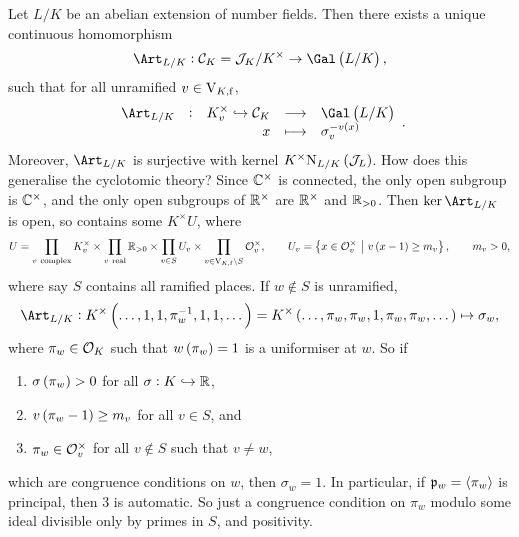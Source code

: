 Let $ L / K $ be an abelian extension of number fields. Then there exists a unique continuous homomorphism
$$ \Art_{L / K} : \CCC_K = \JJJ_K / K^\times \to \Gal\br{L / K}, $$
such that for all unramified $ v \in \mathrm{V}_{K, \mathrm{f}} $,
$$ \function[\Art_{L / K}]{K_v^\times \hookrightarrow \CCC_K}{\Gal\br{L / K}}{x}{\sigma_v^{-v\br{x}}}. $$
Moreover, $ \Art_{L / K} $ is surjective with kernel $ K^\times \N_{L / K}\br{\JJJ_L} $. How does this generalise the cyclotomic theory? Since $ \mathbb{C}^\times $ is connected, the only open subgroup is $ \mathbb{C}^\times $, and the only open subgroups of $ \mathbb{R}^\times $ are $ \mathbb{R}^\times $ and $ \mathbb{R}_{> 0} $. Then $ \ker \Art_{L / K} $ is open, so contains some $ K^\times U $, where
$$ U = \prod_{v \ \text{complex}} K_v^\times \times \prod_{v \ \text{real}} \RR_{> 0} \times \prod_{v \in S} U_v \times \prod_{v \in \V_{K, \f} \setminus S} \OOO_v^\times, \qquad U_v = \cbr{x \in \OOO_v^\times \st v\br{x - 1} \ge m_v}, \qquad m_v > 0, $$
where say $ S $ contains all ramified places. If $ w \notin S $ is unramified,
$$ \Art_{L / K} : K^\times\br{\dots, 1, 1, \pi_w^{-1}, 1, 1, \dots} = K^\times\br{\dots, \pi_w, \pi_w, 1, \pi_w, \pi_w, \dots} \mapsto \sigma_w, $$
where $ \pi_w \in \mathcal{O}_K $ such that $ w\br{\pi_w} = 1 $ is a uniformiser at $ w $. So if
\begin{enumerate}
\item $ \sigma\br{\pi_w} > 0 $ for all $ \sigma : K \hookrightarrow \mathbb{R} $,
\item $ v\br{\pi_w - 1} \ge m_v $ for all $ v \in S $, and
\item $ \pi_w \in \mathcal{O}_v^\times $ for all $ v \notin S $ such that $ v \ne w $,
\end{enumerate}
which are congruence conditions on $ w $, then $ \sigma_w = 1 $. In particular, if $ \mathfrak{p}_w = \left\langle \pi_w \right\rangle $ is principal, then $ 3 $ is automatic. So just a congruence condition on $ \pi_w $ modulo some ideal divisible only by primes in $ S $, and positivity.

\pagebreak

